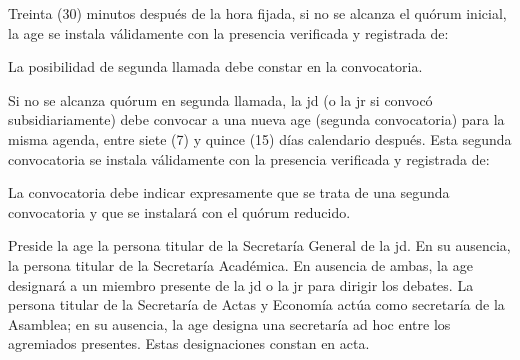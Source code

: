 \documentclass[11pt]{article}
\begin{document}
Treinta (30) minutos después de la hora fijada, si no se alcanza el quórum inicial, la \gls{age} se instala válidamente con la presencia verificada y registrada de:
\begin{artitems}
\end{artitems}
La posibilidad de segunda llamada debe constar en la convocatoria.

Si no se alcanza quórum en segunda llamada, la \gls{jd} (o la \gls{jr} si convocó subsidiariamente) debe convocar a una nueva \gls{age} (segunda convocatoria) para la misma agenda, entre siete (7) y quince (15) días calendario después. Esta segunda convocatoria se instala válidamente con la presencia verificada y registrada de:
\begin{artitems}
\end{artitems}
La convocatoria debe indicar expresamente que se trata de una segunda convocatoria y que se instalará con el quórum reducido.

Preside la \gls{age} la persona titular de la Secretaría General de la \gls{jd}. En su ausencia, la persona titular de la Secretaría Académica. En ausencia de ambas, la \gls{age} designará a un miembro presente de la \gls{jd} o la \gls{jr} para dirigir los debates. La persona titular de la Secretaría de Actas y Economía actúa como secretaría de la Asamblea; en su ausencia, la \gls{age} designa una secretaría ad hoc entre los \glspl{agremiado} presentes. Estas designaciones constan en acta.
\end{document}
